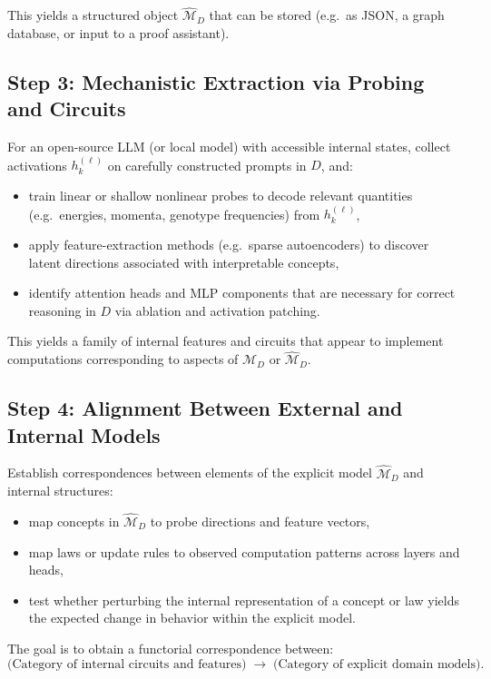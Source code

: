 \documentclass[11pt]{article}
\begin{document}
	This yields a structured object $\hat{\mathcal{M}}_D$ that can be stored (e.g.\ as JSON, a graph database, or input to a proof assistant).
	
	\subsection{Step 3: Mechanistic Extraction via Probing and Circuits}
	
	For an open-source LLM (or local model) with accessible internal states, collect activations $h^{(\ell)}_k$ on carefully constructed prompts in $D$, and:
	\begin{itemize}[nosep]
		\item train linear or shallow nonlinear probes to decode relevant quantities (e.g.\ energies, momenta, genotype frequencies) from $h^{(\ell)}_k$,
		\item apply feature-extraction methods (e.g.\ sparse autoencoders) to discover latent directions associated with interpretable concepts,
		\item identify attention heads and MLP components that are necessary for correct reasoning in $D$ via ablation and activation patching.
	\end{itemize}
	
	This yields a family of internal features and circuits that appear to implement computations corresponding to aspects of $\mathcal{M}_D$ or $\hat{\mathcal{M}}_D$.
	
	\subsection{Step 4: Alignment Between External and Internal Models}
	
	Establish correspondences between elements of the explicit model $\hat{\mathcal{M}}_D$ and internal structures:
	\begin{itemize}[nosep]
		\item map concepts in $\hat{\mathcal{M}}_D$ to probe directions and feature vectors,
		\item map laws or update rules to observed computation patterns across layers and heads,
		\item test whether perturbing the internal representation of a concept or law yields the expected change in behavior within the explicit model.
	\end{itemize}
	
	The goal is to obtain a functorial correspondence between:
	\[
	\text{(Category of internal circuits and features)} \;\longrightarrow\; \text{(Category of explicit domain models)}.
	\]
	
\end{document}
